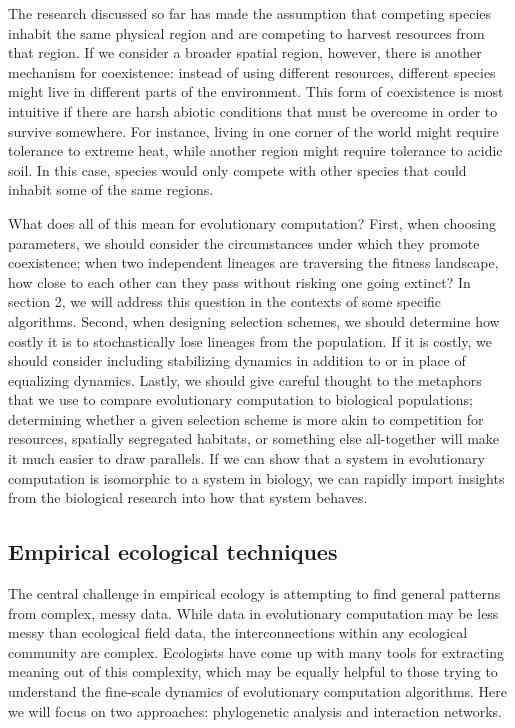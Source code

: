 The research discussed so far has made the assumption that competing species inhabit the same physical region and are competing to harvest resources from that region. If we consider a broader spatial region, however, there is another mechanism for coexistence: instead of using different resources, different species might live in different parts of the environment. This form of coexistence is most intuitive if there are harsh abiotic conditions that must be overcome in order to survive somewhere. For instance, living in one corner of the world might require tolerance to extreme heat, while another region might require tolerance to acidic soil. In this case, species would only compete with other species that could inhabit some of the same regions.

What does all of this mean for evolutionary computation? First, when choosing parameters, we should consider the circumstances under which they promote coexistence; when two independent lineages are traversing the fitness landscape, how close to each other can they pass without risking one going extinct? In section 2, we will address this question in the contexts of some specific algorithms. Second, when designing selection schemes, we should determine how costly it is to stochastically lose lineages from the population. If it is costly, we should consider including stabilizing dynamics in addition to or in place of equalizing dynamics. Lastly, we should give careful thought to the metaphors that we use to compare evolutionary computation to biological populations; determining whether a given selection scheme is more akin to competition for resources, spatially segregated habitats, or something else all-together will make it much easier to draw parallels. If we can show that a system in evolutionary computation is isomorphic to a system in biology, we can rapidly import insights from the biological research into how that system behaves.

\subsection{Empirical ecological techniques}

The central challenge in empirical ecology is attempting to find general patterns  from complex, messy data. While data in evolutionary computation may be less messy than ecological field data, the interconnections within any ecological community are complex. Ecologists have come up with many tools for extracting meaning out of this complexity, which may be equally helpful to those trying to understand the fine-scale dynamics of evolutionary computation algorithms. Here we will focus on two approaches: phylogenetic analysis and interaction networks.

